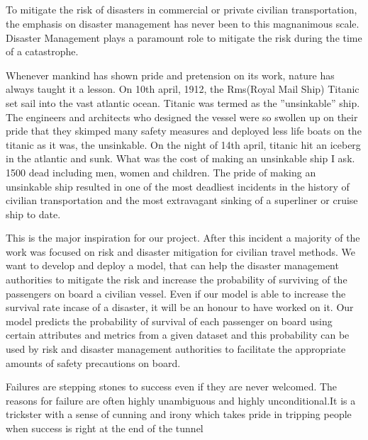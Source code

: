 \documentclass[12pt]{article}
\newcommand{\nd}{\noindent}
\newcommand{\subsize}{\fontsize{14pt}{12pt}\selectfont}
\begin{document}
\newpage

\subsection{\textbf{\subsize{MOTIVATION}}}
\nd To mitigate the risk of disasters in commercial or private civilian transportation, the emphasis on disaster management has never been to this magnanimous scale. Disaster Management plays a paramount role to mitigate the risk during the time of a catastrophe. 

\nd Whenever mankind has shown pride and pretension on its work, nature has always taught it a lesson. On 10th april, 1912, the Rms(Royal Mail Ship) Titanic set sail into the vast atlantic ocean. Titanic was termed as the ”unsinkable” ship. The engineers and architects who designed the vessel were so swollen up on their pride that they skimped many safety measures and deployed less life boats on the titanic as it was, the unsinkable. On the night of 14th april, titanic hit an iceberg in the atlantic and sunk. What was the cost of making an unsinkable ship I ask. 1500 dead including men, women and children. The pride of making an unsinkable ship resulted in one of the most deadliest incidents in the history of civilian transportation and the most extravagant sinking of a superliner or cruise ship to date.

\nd This is the major inspiration for our project. After this incident a majority of the work was focused on risk and disaster mitigation for civilian travel methods. We want to develop and deploy a model, that can help the disaster management authorities to mitigate the risk and increase the probability of surviving of the passengers on board a civilian vessel. Even if our model is able to increase the survival rate incase of a disaster, it will be an honour to have worked on it. Our model predicts the probability of survival of each passenger on board using certain attributes and metrics from a given dataset and this probability can be used by risk and disaster management authorities to facilitate the appropriate amounts of safety precautions on board.

\nd Failures are stepping stones to success even if they are never welcomed. The reasons for failure are often highly unambiguous and highly unconditional.It is a trickster with a sense of cunning and irony which takes pride in tripping people when success is right at the end of the tunnel 

\newpage
\end{document}
